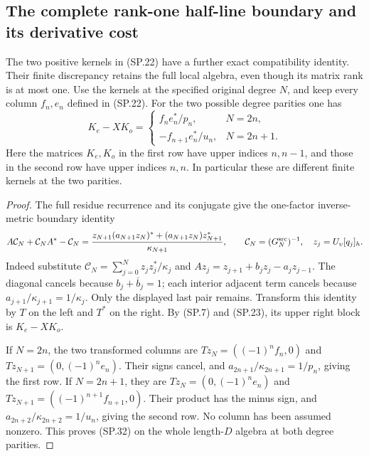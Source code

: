 \subsection{The complete rank-one half-line boundary and its derivative cost}

The two positive kernels in (SP.22) have a further exact compatibility
identity. Their finite discrepancy retains the full local algebra, even
though its matrix rank is at most one. Use the kernels at the specified
original degree \(N\), and keep every column \(f_n,e_n\) defined in
(SP.22). For the two possible degree parities one has
\[
 \boxed{
 K_e-XK_o=
 \begin{cases}
       f_n e_n^*/p_n,&N=2n,\\[2pt]
       -f_{n+1}e_n^*/u_n,&N=2n+1.
 \end{cases}}
 \tag{SP.32}
\]
Here the matrices \(K_e,K_o\) in the first row have upper indices
\(n,n-1\), and those in the second row have upper indices \(n,n\).
In particular these are different finite kernels at the two parities.

\begin{proof}
The full residue recurrence and its conjugate give the one-factor
inverse-metric boundary identity
\[
 A\mathcal C_N+\mathcal C_NA^*-\mathcal C_N
   =\frac{z_{N+1}(a_{N+1}z_N)^*
                +(a_{N+1}z_N)z_{N+1}^*}{\kappa_{N+1}},
 \qquad
 \mathcal C_N=(G_N^{\rm src})^{-1},\quad
 z_j=U_\upsilon[q_j]_h.
\]
Indeed substitute \(\mathcal C_N=\sum_{j=0}^Nz_jz_j^*/\kappa_j\)
and \(Az_j=z_{j+1}+b_jz_j-a_jz_{j-1}\). The diagonal cancels
because \(b_j+\overline b_j=1\); each interior adjacent term
cancels because \(a_{j+1}/\kappa_{j+1}=1/\kappa_j\).
Only the displayed last pair remains. Transform this identity by
\(T\) on the left and \(T^*\) on the right. By (SP.7) and
(SP.23), its upper right block is \(K_e-XK_o\).

If \(N=2n\), the two transformed columns are
\(Tz_N=((-1)^nf_n,0)\) and
\(Tz_{N+1}=(0,(-1)^ne_n)\). Their signs cancel, and
\(a_{2n+1}/\kappa_{2n+1}=1/p_n\), giving the first row.
If \(N=2n+1\), they are
\(Tz_N=(0,(-1)^ne_n)\) and
\(Tz_{N+1}=((-1)^{n+1}f_{n+1},0)\). Their product has
the minus sign, and
\(a_{2n+2}/\kappa_{2n+2}=1/u_n\), giving the second row.
No column has been assumed nonzero. This proves (SP.32) on
the whole length-\(D\) algebra at both degree parities.
\end{proof}

